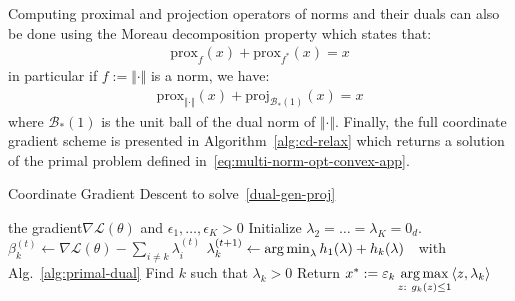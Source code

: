 Computing proximal and projection operators of norms and their duals can also be done using the Moreau decomposition property which states that:
\begin{align*}
    \text{prox}_{f}(x) + \text{prox}_{f^*}(x) = x
\end{align*}
in particular if $f:=\Vert \cdot \Vert$ is a norm, we have:
\begin{align*}
    \text{prox}_{\Vert \cdot \Vert}(x) + \text{proj}_{\mathcal{B}_{*}(1)}(x) = x
\end{align*}
where $\mathcal{B}_{*}(1)$ is the unit ball of the dual norm of $\Vert \cdot \Vert$. Finally, the full coordinate gradient scheme is presented in Algorithm~\ref{alg:cd-relax} which returns a solution of the primal problem defined in~\eqref{eq:multi-norm-opt-convex-app}.

\begin{algorithm}[tb]
   \caption{Coordinate Gradient Descent to solve~\eqref{dual-gen-proj}}
   \label{alg:cd-relax}
\begin{algorithmic}
    the gradient$\nabla\mathcal{L}(\theta)$ and  $\epsilon_1,\dots,\epsilon_K>0$
   \STATE Initialize $\lambda_2=\dots=\lambda_K=0_d$.
   \STATE $\beta_k^{(t)}\gets\nabla\mathcal{L}(\theta) - \sum\limits_{i\neq k}\lambda_i^{(t)}$
   \STATE $\lambda_k^{(t+1)} \gets \operatorname*{arg\,min}_{\lambda} h_1(\lambda) + h_k(\lambda)$~~with Alg.~\ref{alg:primal-dual}
   \ENDFOR
    \ENDFOR
    \STATE Find $k$ such that $\lambda_k>0$
    \STATE Return $x^*:=\varepsilon_k\operatorname*{arg\,max}\limits_{z:~g_k(z)\leq 1} \langle z,\lambda_k\rangle$
\end{algorithmic}
\end{algorithm}



